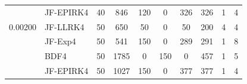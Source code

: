 \begin{table}[htb]
\begin{adjustbox}{width=0.9\columnwidth,center}
\begin{tabular}{cccccccccc}
			\multicolumn{1}{l}{} & \multicolumn{1}{l}{JF-EPIRK4} & 40 & 846 & 120 & 0 &
			326 & 326 & 1 & 4 \\
			\multicolumn{1}{l}{0.00200} & \multicolumn{1}{l}{JF-LLRK4} & 50 & 650 & 50
			& 0 & 50 & 200 & 4 & 4 \\
			\multicolumn{1}{l}{} & \multicolumn{1}{l}{JF-Exp4} & 50 & 541 & 150 & 0 & 289
			& 291 & 1 & 8 \\
			\multicolumn{1}{l}{} & \multicolumn{1}{l}{BDF4} & 50 & 1785 & 0 & 150 & 0 &
			457 & 1 & 5 \\
			\multicolumn{1}{l}{} & \multicolumn{1}{l}{JF-EPIRK4} & 50 & 1027 & 150 & 0 &
			377 & 377 & 1 & 4 \\
			\hline
		\end{tabular}
	\end{adjustbox}
	\label{tab:br2d}
\end{table}

